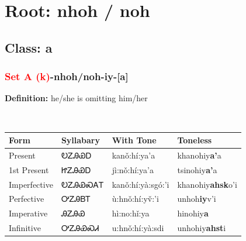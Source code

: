\needspace{4in}
\section*{Root: nhoh / noh}
\nopagebreak
{}
\needspace{3in}
\subsection*{Class: a}
\nopagebreak
\needspace{2in}
\subsubsection*{\textcolor{Red}{Set A (k)}{-}\textbf{nhoh/noh}{-}iy{-}[a]}
\nopagebreak
\textbf{Definition: } he/she is omitting him/her
\\[0.5em]
\begin{tabularx}{\textwidth}{l X X X}%
\toprule%
\textbf{Form}&\textbf{Syllabary}&\textbf{With Tone}&\textbf{Toneless}\\%
\midrule%
Present&ᎧᏃᎯᏯᎠ&kanǒ:hí:ya’a&khanohiy\textbf{a'}a\\%
1st Present&ᏥᏃᎯᏯᎠ&jì:nǒ:hí:ya’a&tsinohiy\textbf{a'}a\\%
Imperfective&ᎧᏃᎯᏯᏍᎪᎢ&kanǒ:hí:yà:sgó:’i&khanohiy\textbf{ahsk}o'i\\%
Perfective&ᎤᏃᎯᏴᎢ&ù:hnǒ:hí:yv̌:’i&unhoh\textbf{iy}v'i\\%
Imperative&ᎯᏃᎯᏯ&hì:no:hǐ:ya&hinohiy\textbf{a}\\%
Infinitive&ᎤᏃᎯᏯᏍᏗ&u:hnǒ:hí:yà:sdi&unhohiy\textbf{ahst}i\\%
\bottomrule%
\end{tabularx}
\\[1em]